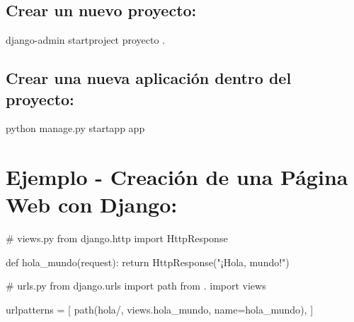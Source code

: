 \documentclass[
  a4paper,
  onepage,
  openany]{scrreprt}
\newenvironment{Shaded}{\begin{snugshade}}{\end{snugshade}}
\newcommand{\CommentTok}[1]{\textcolor[rgb]{0.37,0.37,0.37}{#1}}
\newcommand{\ControlFlowTok}[1]{\textcolor[rgb]{0.00,0.23,0.31}{#1}}
\newcommand{\ExtensionTok}[1]{\textcolor[rgb]{0.00,0.23,0.31}{#1}}
\newcommand{\ImportTok}[1]{\textcolor[rgb]{0.00,0.46,0.62}{#1}}
\newcommand{\KeywordTok}[1]{\textcolor[rgb]{0.00,0.23,0.31}{#1}}
\newcommand{\NormalTok}[1]{\textcolor[rgb]{0.00,0.23,0.31}{#1}}
\newcommand{\OperatorTok}[1]{\textcolor[rgb]{0.37,0.37,0.37}{#1}}
\newcommand{\StringTok}[1]{\textcolor[rgb]{0.13,0.47,0.30}{#1}}
\begin{document}
\hypertarget{crear-un-nuevo-proyecto}{%
\subsection{Crear un nuevo proyecto:}\label{crear-un-nuevo-proyecto}}

\begin{Shaded}
\begin{Highlighting}[]
\ExtensionTok{django{-}admin}\NormalTok{ startproject proyecto .}
\end{Highlighting}
\end{Shaded}

\hypertarget{crear-una-nueva-aplicaciuxf3n-dentro-del-proyecto}{%
\subsection{Crear una nueva aplicación dentro del
proyecto:}\label{crear-una-nueva-aplicaciuxf3n-dentro-del-proyecto}}

\begin{Shaded}
\begin{Highlighting}[]
\ExtensionTok{python}\NormalTok{ manage.py startapp app}
\end{Highlighting}
\end{Shaded}

\hypertarget{ejemplo---creaciuxf3n-de-una-puxe1gina-web-con-django}{%
\section{Ejemplo - Creación de una Página Web con
Django:}\label{ejemplo---creaciuxf3n-de-una-puxe1gina-web-con-django}}

\begin{Shaded}
\begin{Highlighting}[]
\CommentTok{\# views.py}
\ImportTok{from}\NormalTok{ django.http }\ImportTok{import}\NormalTok{ HttpResponse}

\KeywordTok{def}\NormalTok{ hola\_mundo(request):}
    \ControlFlowTok{return}\NormalTok{ HttpResponse(}\StringTok{"¡Hola, mundo!"}\NormalTok{)}
\end{Highlighting}
\end{Shaded}

\begin{Shaded}
\begin{Highlighting}[]
\CommentTok{\# urls.py}
\ImportTok{from}\NormalTok{ django.urls }\ImportTok{import}\NormalTok{ path}
\ImportTok{from}\NormalTok{ . }\ImportTok{import}\NormalTok{ views}

\NormalTok{urlpatterns }\OperatorTok{=}\NormalTok{ [}
\NormalTok{    path(}\StringTok{\textquotesingle{}hola/\textquotesingle{}}\NormalTok{, views.hola\_mundo, name}\OperatorTok{=}\StringTok{\textquotesingle{}hola\_mundo\textquotesingle{}}\NormalTok{),}
\NormalTok{]}
\end{Highlighting}
\end{Shaded}
\end{document}
